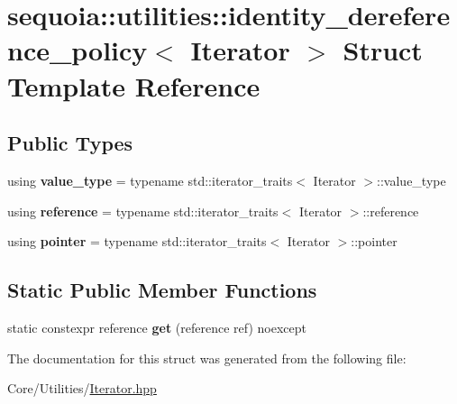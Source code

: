 \hypertarget{structsequoia_1_1utilities_1_1identity__dereference__policy}{}\section{sequoia\+::utilities\+::identity\+\_\+dereference\+\_\+policy$<$ Iterator $>$ Struct Template Reference}
\label{structsequoia_1_1utilities_1_1identity__dereference__policy}
\subsection*{Public Types}
\begin{DoxyCompactItemize}
\item 
\mbox{\label{structsequoia_1_1utilities_1_1identity__dereference__policy_adbf814cd794163884d5fe9a4e7c50d43}} 
using {\bfseries value\+\_\+type} = typename std\+::iterator\+\_\+traits$<$ Iterator $>$\+::value\+\_\+type
\item 
\mbox{\label{structsequoia_1_1utilities_1_1identity__dereference__policy_ae7dbecf94a34b7c642eacb7d77b3ac27}} 
using {\bfseries reference} = typename std\+::iterator\+\_\+traits$<$ Iterator $>$\+::reference
\item 
\mbox{\label{structsequoia_1_1utilities_1_1identity__dereference__policy_a7e4aa48f55968b3a293f060f1307a597}} 
using {\bfseries pointer} = typename std\+::iterator\+\_\+traits$<$ Iterator $>$\+::pointer
\end{DoxyCompactItemize}
\subsection*{Static Public Member Functions}
\begin{DoxyCompactItemize}
\item 
\mbox{\label{structsequoia_1_1utilities_1_1identity__dereference__policy_a4265163d49461e9b24d36a95b0b03219}} 
static constexpr reference {\bfseries get} (reference ref) noexcept
\end{DoxyCompactItemize}


The documentation for this struct was generated from the following file\+:\begin{DoxyCompactItemize}
\item 
Core/\+Utilities/\mbox{\hyperlink{_iterator_8hpp}{Iterator.\+hpp}}\end{DoxyCompactItemize}
